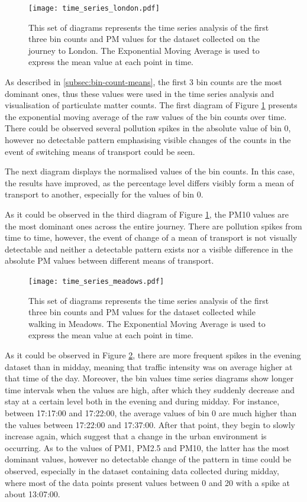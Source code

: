 \documentclass[bsc,frontabs,twoside,singlespacing, parskip,deptreport]{infthesis}     %
\begin{document}
\begin{figure}[h!]
  \center
  \texttt{[image: time\_series\_london.pdf]} 
  \caption{This set of diagrams represents the time series analysis of the first three bin counts and PM values for the dataset collected on the journey to London. The Exponential Moving Average is used to express the mean value at each point in time.}
  \label{fig:time_series_london}
\end{figure}

As described in \ref{subsec:bin-count-means}, the first 3 bin counts are the most dominant ones, thus these values were used in the time series analysis and visualisation of particulate matter counts. The first diagram of Figure \ref{fig:time_series_london} presents the exponential moving average of the raw values of the bin counts over time. There could be observed several pollution spikes in the absolute value of bin 0, however no detectable pattern emphasising visible changes of the counts in the event of switching means of transport could be seen.

The next diagram displays the normalised values of the bin counts. In this case, the results have improved, as the percentage level differs visibly form a mean of transport to another, especially for the values of bin 0.

As it could be observed in the third diagram of Figure \ref{fig:time_series_london}, the PM10 values are the most dominant ones across the entire journey. There are pollution spikes from time to time, however, the event of change of a mean of transport is not visually detectable and neither a detectable pattern exists nor a visible difference in the absolute PM values between different means of transport.

\begin{figure}[h!]
  \center
  \texttt{[image: time\_series\_meadows.pdf]} 
  \caption{This set of diagrams represents the time series analysis of the first three bin counts and PM values for the dataset collected while walking in Meadows. The Exponential Moving Average is used to express the mean value at each point in time.}
  \label{fig:time_series_meadows}
\end{figure}

As it could be observed in Figure \ref{fig:time_series_meadows}, there are more frequent spikes in the evening dataset than in midday, meaning that traffic intensity was on average higher at that time of the day. Moreover, the bin values time series diagrams show longer time intervals when the values are high, after which they suddenly decrease and stay at a certain level both in the evening and during midday. For instance, between 17:17:00 and 17:22:00, the average values of bin 0 are much higher than the values between 17:22:00 and 17:37:00. After that point, they begin to slowly increase again, which suggest that a change in the urban environment is occurring. As to the values of PM1, PM2.5 and PM10, the latter has the most dominant values, however no detectable change of the pattern in time could be observed, especially in the dataset containing data collected during midday, where most of the data points present values between 0 and 20 with a spike at about 13:07:00.
\end{document}
